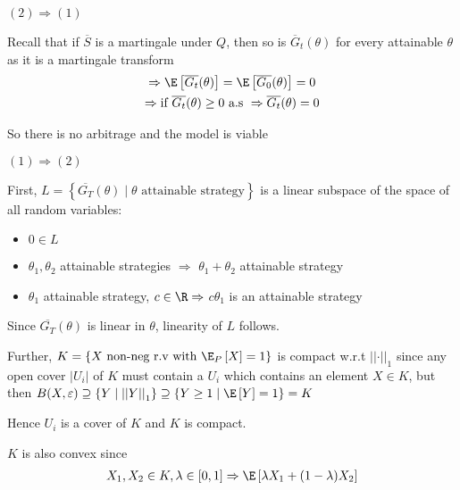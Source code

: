 \begin{prf}[]{}
    $(2)\Rightarrow (1)$\par
    \noindent Recall that if $\overline{S}$ is a martingale under $Q$, then so is $\overline{G}_t(\theta)$ for every attainable $\theta$ as it is a martingale transform
    \begin{equation*}
      \begin{gathered}
        \Rightarrow \E\left[\overline{G_t}(\theta)\right] = \E\left[\overline{G_0}(\theta)\right]=0\\
        \Rightarrow\text{if } \overline{G_t}(\theta)\geq0\text{ a.s }\Rightarrow \overline{G_t}(\theta)=0
      \end{gathered}
    \end{equation*}\par
    \noindent So there is no arbitrage and the model is viable
    \par\bigskip
    $(1)\Rightarrow (2)$\par
    \noindent First, $L = \left\{\overline{G_T}(\theta)\mid\text{$\theta$ attainable strategy}\right\}$ is a linear subspace of the space of all random variables:\par
    \begin{itemize}
      \item $0\in L$
      \item $\theta_1,\theta_2$ attainable strategies $\Rightarrow$ $\theta_1+\theta_2$ attainable strategy
      \item $\theta_1$ attainable strategy, $c\in\R\Rightarrow$ $c\theta_1$ is an attainable strategy
    \end{itemize}\par
    \noindent Since $\overline{G_T}(\theta)$ is linear in $\theta$, linearity of $L$ follows.\par
    \noindent Further, $K =\left\{X\text{ non-neg r.v with } \E_P\left[X\right]=1\right\}$ is compact w.r.t $\left|\left|\cdot\right|\right|_1$ since any open cover $\left|U_i\right|$ of $K$ must contain a $U_i$ which contains an element $X\in K$, but then $B(X,\varepsilon)\supseteq \left\{Y\mid\left|\left|Y\right|\right|_1\right\}\supseteq\left\{Y\geq 1\mid \E\left[Y\right]=1\right\} = K$\par
    \noindent Hence $U_i$ is a cover of $K$ and $K$ is compact.\par
    \noindent $K$ is also convex since
    \begin{equation*}
      \begin{gathered}
        X_1,X_2\in K,\lambda\in [0,1]\Rightarrow \E\left[\lambda X_1+(1-\lambda)X_2\right]\\

\end{gathered}
\end{equation*}
\end{prf}
